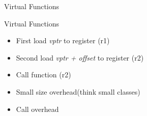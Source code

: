 \begin{frame}{Virtual Functions}
    \begin{center}
    \end{center}
\end{frame}

\begin{frame}{Virtual Functions}
    \begin{itemize}
        \item First load \emph{vptr} to register (r1)
        \item Second load \emph{vptr + offset} to register (r2)
        \item Call function (r2)
    \end{itemize}

    \begin{itemize}
        \item Small size overhead(think small classes)
        \item Call overhead
    \end{itemize}
\end{frame}

